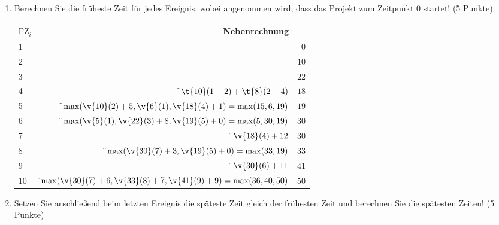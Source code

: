 \documentclass{lehramt-informatik-minimal}
\begin{document}
\begin{enumerate}


\item Berechnen Sie die früheste Zeit für jedes Ereignis, wobei
angenommen wird, dass das Projekt zum Zeitpunkt 0 startet! (5 Punkte)

\begin{antwort}
\begin{tabular}{|l|r|r|}
\hline
$\text{FZ}_i$ & Nebenrechnung & \\\hline\hline
1 &                                                                           & $0$ \\\hline
2 &                                                                           & $10$ \\\hline
3 &                                                                           & $22$ \\\hline
4 & \f$\t{10}(1-2) + \t{8}(2-4) $                                             & $18$ \\\hline
5 & \f$\max(\v{10}(2) + 5,\v{6}(1),\v{18}(4) + 1) = \max(15,6,19)$            & $19$ \\\hline
6 & \f$\max(\v{5}(1),\v{22}(3) + 8, \v{19}(5) + 0) = \max(5, 30, 19)$         & $30$ \\\hline
7 & \f$\v{18}(4) + 12$                                                        & $30$ \\\hline
8 & \f$\max(\v{30}(7) + 3, \v{19}(5) + 0) = \max(33,19)$                      & $33$ \\\hline
9 & \f$\v{30}(6) + 11$                                                        & $41$ \\\hline
10 & \f$\max(\v{30}(7) + 6, \v{33}(8) + 7, \v{41}(9) + 9) = \max(36, 40, 50)$ & $50$ \\\hline
\end{tabular}
\end{antwort}


\item Setzen Sie anschließend beim letzten Ereignis die späteste Zeit
gleich der frühesten Zeit und berechnen Sie die spätesten Zeiten! (5
Punkte)


\end{enumerate}
\end{document}
